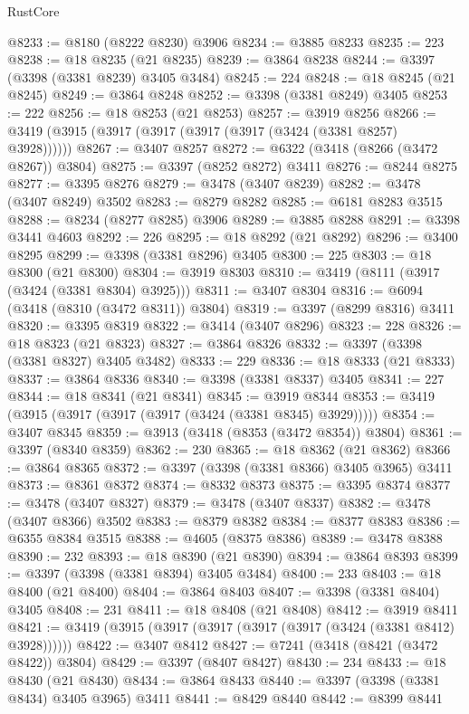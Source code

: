 \begin{lexlean}{RustCore}
\begin{coremodule}
@8233 := @8180 (@8222 @8230) @3906
@8234 := @3885 @8233
@8235 := 223
@8238 := @18 @8235 (@21 @8235)
@8239 := @3864 @8238
@8244 := @3397 (@3398 (@3381 @8239) @3405 @3484)
@8245 := 224
@8248 := @18 @8245 (@21 @8245)
@8249 := @3864 @8248
@8252 := @3398 (@3381 @8249) @3405
@8253 := 222
@8256 := @18 @8253 (@21 @8253)
@8257 := @3919 @8256
@8266 := @3419 (@3915 (@3917 (@3917 (@3917 (@3917 (@3424 (@3381 @8257) @3928))))))
@8267 := @3407 @8257
@8272 := @6322 (@3418 (@8266 (@3472 @8267)) @3804)
@8275 := @3397 (@8252 @8272) @3411
@8276 := @8244 @8275
@8277 := @3395 @8276
@8279 := @3478 (@3407 @8239)
@8282 := @3478 (@3407 @8249) @3502
@8283 := @8279 @8282
@8285 := @6181 @8283 @3515
@8288 := @8234 (@8277 @8285) @3906
@8289 := @3885 @8288
@8291 := @3398 @3441 @4603
@8292 := 226
@8295 := @18 @8292 (@21 @8292)
@8296 := @3400 @8295
@8299 := @3398 (@3381 @8296) @3405
@8300 := 225
@8303 := @18 @8300 (@21 @8300)
@8304 := @3919 @8303
@8310 := @3419 (@8111 (@3917 (@3424 (@3381 @8304) @3925)))
@8311 := @3407 @8304
@8316 := @6094 (@3418 (@8310 (@3472 @8311)) @3804)
@8319 := @3397 (@8299 @8316) @3411
@8320 := @3395 @8319
@8322 := @3414 (@3407 @8296)
@8323 := 228
@8326 := @18 @8323 (@21 @8323)
@8327 := @3864 @8326
@8332 := @3397 (@3398 (@3381 @8327) @3405 @3482)
@8333 := 229
@8336 := @18 @8333 (@21 @8333)
@8337 := @3864 @8336
@8340 := @3398 (@3381 @8337) @3405
@8341 := 227
@8344 := @18 @8341 (@21 @8341)
@8345 := @3919 @8344
@8353 := @3419 (@3915 (@3917 (@3917 (@3917 (@3424 (@3381 @8345) @3929)))))
@8354 := @3407 @8345
@8359 := @3913 (@3418 (@8353 (@3472 @8354)) @3804)
@8361 := @3397 (@8340 @8359)
@8362 := 230
@8365 := @18 @8362 (@21 @8362)
@8366 := @3864 @8365
@8372 := @3397 (@3398 (@3381 @8366) @3405 @3965) @3411
@8373 := @8361 @8372
@8374 := @8332 @8373
@8375 := @3395 @8374
@8377 := @3478 (@3407 @8327)
@8379 := @3478 (@3407 @8337)
@8382 := @3478 (@3407 @8366) @3502
@8383 := @8379 @8382
@8384 := @8377 @8383
@8386 := @6355 @8384 @3515
@8388 := @4605 (@8375 @8386)
@8389 := @3478 @8388
@8390 := 232
@8393 := @18 @8390 (@21 @8390)
@8394 := @3864 @8393
@8399 := @3397 (@3398 (@3381 @8394) @3405 @3484)
@8400 := 233
@8403 := @18 @8400 (@21 @8400)
@8404 := @3864 @8403
@8407 := @3398 (@3381 @8404) @3405
@8408 := 231
@8411 := @18 @8408 (@21 @8408)
@8412 := @3919 @8411
@8421 := @3419 (@3915 (@3917 (@3917 (@3917 (@3917 (@3424 (@3381 @8412) @3928))))))
@8422 := @3407 @8412
@8427 := @7241 (@3418 (@8421 (@3472 @8422)) @3804)
@8429 := @3397 (@8407 @8427)
@8430 := 234
@8433 := @18 @8430 (@21 @8430)
@8434 := @3864 @8433
@8440 := @3397 (@3398 (@3381 @8434) @3405 @3965) @3411
@8441 := @8429 @8440
@8442 := @8399 @8441

\end{coremodule}
\end{lexlean}
